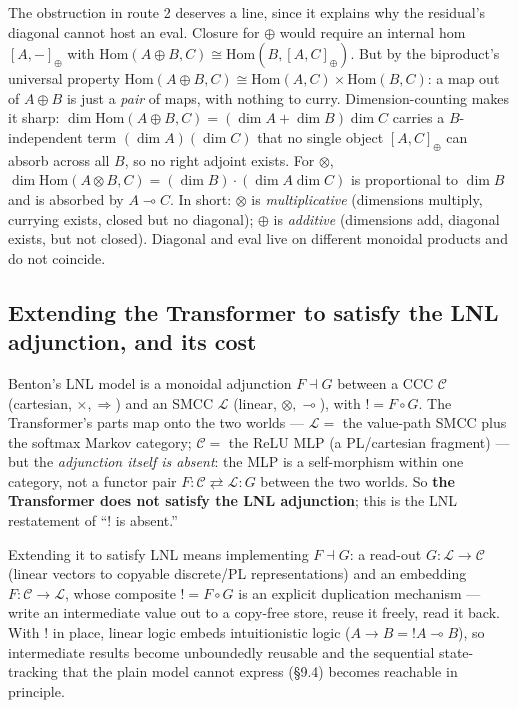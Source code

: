 \documentclass[a4paper,11pt]{article}
\begin{document}
The obstruction in route 2 deserves a line, since it explains why the
residual's diagonal cannot host an eval. Closure for \(\oplus\) would
require an internal hom \([A,-]_\oplus\) with
\(\mathrm{Hom}(A\oplus B, C) \cong \mathrm{Hom}(B,[A,C]_\oplus)\). But
by the biproduct's universal property
\(\mathrm{Hom}(A\oplus B, C) \cong \mathrm{Hom}(A,C)\times\mathrm{Hom}(B,C)\):
a map out of \(A\oplus B\) is just a \emph{pair} of maps, with nothing
to curry. Dimension-counting makes it sharp:
\(\dim\mathrm{Hom}(A\oplus B,C) = (\dim A + \dim B)\dim C\) carries a
\(B\)-independent term \((\dim A)(\dim C)\) that no single object
\([A,C]_\oplus\) can absorb across all \(B\), so no right adjoint
exists. For \(\otimes\),
\(\dim\mathrm{Hom}(A\otimes B,C) = (\dim B)\cdot(\dim A\dim C)\) is
proportional to \(\dim B\) and is absorbed by \(A\multimap C\). In
short: \(\otimes\) is \emph{multiplicative} (dimensions multiply,
currying exists, closed but no diagonal); \(\oplus\) is \emph{additive}
(dimensions add, diagonal exists, but not closed). Diagonal and eval
live on different monoidal products and do not coincide.

\hypertarget{extending-the-transformer-to-satisfy-the-lnl-adjunction-and-its-cost}{%
\subsection{Extending the Transformer to satisfy the LNL adjunction, and its cost}\label{extending-the-transformer-to-satisfy-the-lnl-adjunction-and-its-cost}}

Benton's LNL model is a monoidal adjunction \(F\dashv G\) between a CCC \(\mathcal{C}\) (cartesian, \(\times,\Rightarrow\)) and an SMCC \(\mathcal{L}\) (linear, \(\otimes,\multimap\)), with \(!=F\circ G\).
The Transformer's parts map onto the two worlds --- \(\mathcal{L}=\) the value-path SMCC plus the softmax Markov category; \(\mathcal{C}=\) the ReLU MLP (a PL/cartesian fragment) --- but the \emph{adjunction itself
is absent}: the MLP is a self-morphism within one category, not a functor pair \(F:\mathcal{C}\rightleftarrows\mathcal{L}:G\) between the
two worlds. So \textbf{the Transformer does not satisfy the LNL adjunction}; this is the LNL restatement of ``\(!\) is absent.''

Extending it to satisfy LNL means implementing \(F\dashv G\): a read-out
\(G:\mathcal{L}\to\mathcal{C}\) (linear vectors to copyable discrete/PL representations) and an embedding \(F:\mathcal{C}\to\mathcal{L}\), whose
composite \(!=F\circ G\) is an explicit duplication mechanism --- write an intermediate value out to a copy-free store, reuse it freely, read it
back. With \(!\) in place, linear logic embeds intuitionistic logic (\(A\to B = {!A}\multimap B\)), so intermediate results become unboundedly reusable and the sequential state-tracking that the plain model cannot express (§9.4) becomes reachable in principle.
\end{document}
